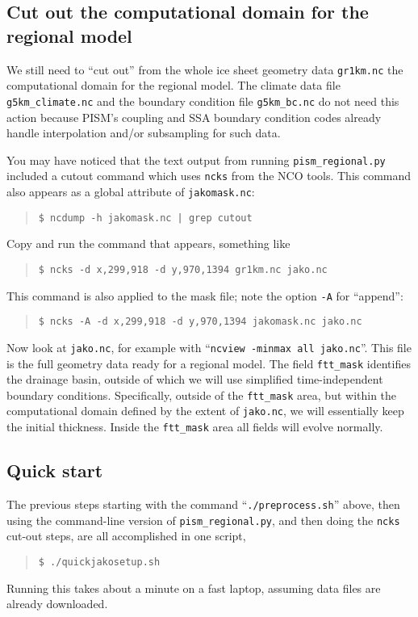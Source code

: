 \subsection*{Cut out the computational domain for the regional model}
We still need to ``cut out'' from the whole ice sheet geometry data \texttt{gr1km.nc} the computational domain for the regional model.  The climate data file \texttt{g5km_climate.nc} and the boundary condition file \texttt{g5km_bc.nc} do not need this action because PISM's coupling and SSA boundary condition codes already handle interpolation and/or subsampling for such data.

You may have noticed that the text output from running \texttt{pism_regional.py} included a cutout command which uses \texttt{ncks} from the NCO tools.  This command also appears as a global attribute of \texttt{jakomask.nc}:
\begin{quote}\small
\begin{verbatim}
$ ncdump -h jakomask.nc | grep cutout
\end{verbatim}
\normalsize\end{quote}
Copy and run the command that appears, something like
\begin{quote}\small
\begin{verbatim}
$ ncks -d x,299,918 -d y,970,1394 gr1km.nc jako.nc
\end{verbatim}
\normalsize\end{quote}
This command is also applied to the mask file; note the option \texttt{-A} for ``append'':
\begin{quote}\small
\begin{verbatim}
$ ncks -A -d x,299,918 -d y,970,1394 jakomask.nc jako.nc
\end{verbatim}
\normalsize\end{quote}
Now look at \texttt{jako.nc}, for example with ``\texttt{ncview -minmax all jako.nc}''.  This file is the full geometry data ready for a regional model.  The field \texttt{ftt_mask} identifies the drainage basin, outside of which we will use simplified time-independent boundary conditions.  Specifically, outside of the \texttt{ftt_mask} area, but within the computational domain defined by the extent of \texttt{jako.nc}, we will essentially keep the initial thickness.  Inside the \texttt{ftt_mask} area all fields will evolve normally.

\subsection*{Quick start}
The previous steps starting with the command ``\texttt{./preprocess.sh}'' above, then using the command-line version of \texttt{pism_regional.py}, and then doing the \texttt{ncks} cut-out steps, are all accomplished in one script,
\begin{quote}\small
\begin{verbatim}
$ ./quickjakosetup.sh
\end{verbatim}
\normalsize\end{quote}
Running this takes about a minute on a fast laptop, assuming data files are already downloaded.

